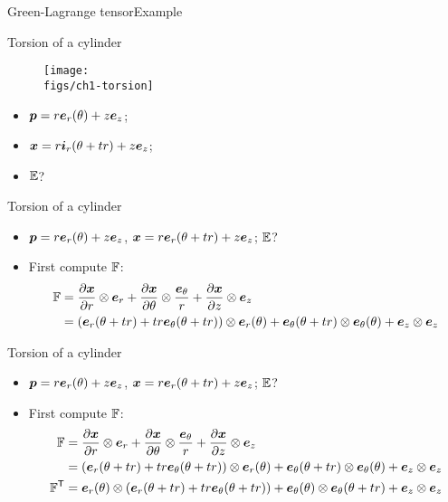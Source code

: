 \begin{frame}{Green-Lagrange tensor}{Example}

\begin{overprint}

\vskip-20pt
\begin{block}{Torsion of a cylinder}
\begin{figure}
\centering\texttt{[image: \\figs/ch1-torsion]}
\end{figure}
\begin{itemize}
\item ${\boldsymbol{p}}=r{\boldsymbol{e}}_r(\theta)+z{\boldsymbol{e}}_z$;
\item ${\boldsymbol{x}}=r{\boldsymbol{i}}_r(\theta+tr)+z{\boldsymbol{e}}_z$;
\item ${\mathbb{E}}$?
\end{itemize}
\end{block}

\vskip-20pt
\begin{block}{Torsion of a cylinder}
\begin{itemize}
\item ${\boldsymbol{p}}=r{\boldsymbol{e}}_r(\theta)+z{\boldsymbol{e}}_z$, ${\boldsymbol{x}}=r{\boldsymbol{e}}_r(\theta+tr)+z{\boldsymbol{e}}_z$; ${\mathbb{E}}$?
\item First compute ${\mathbb F}$:
{\scriptsize
\begin{displaymath}
\begin{split}
{\mathbb F} &=\frac{\partial{\boldsymbol{x}}}{\partial r}\otimes{\boldsymbol{e}}_r+\frac{\partial{\boldsymbol{x}}}{\partial\theta}\otimes\frac{{\boldsymbol{e}}_\theta}{r}+\frac{\partial{\boldsymbol{x}}}{\partial z}\otimes{\boldsymbol{e}}_z \\
&=({\boldsymbol{e}}_r(\theta+tr)+tr{\boldsymbol{e}}_\theta(\theta+tr))\otimes{\boldsymbol{e}}_r(\theta)+{\boldsymbol{e}}_\theta(\theta+tr)\otimes{\boldsymbol{e}}_\theta(\theta)+{\boldsymbol{e}}_z\otimes{\boldsymbol{e}}_z
\end{split}
\end{displaymath}}
\end{itemize}
\end{block}

\vskip-20pt
\begin{block}{Torsion of a cylinder}
\begin{itemize}
\item ${\boldsymbol{p}}=r{\boldsymbol{e}}_r(\theta)+z{\boldsymbol{e}}_z$, ${\boldsymbol{x}}=r{\boldsymbol{e}}_r(\theta+tr)+z{\boldsymbol{e}}_z$; ${\mathbb{E}}$?
\item First compute ${\mathbb F}$:
{\scriptsize
\begin{displaymath}
\begin{split}
{\mathbb F} &=\frac{\partial{\boldsymbol{x}}}{\partial r}\otimes{\boldsymbol{e}}_r+\frac{\partial{\boldsymbol{x}}}{\partial\theta}\otimes\frac{{\boldsymbol{e}}_\theta}{r}+\frac{\partial{\boldsymbol{x}}}{\partial z}\otimes{\boldsymbol{e}}_z \\
&=({\boldsymbol{e}}_r(\theta+tr)+tr{\boldsymbol{e}}_\theta(\theta+tr))\otimes{\boldsymbol{e}}_r(\theta)+{\boldsymbol{e}}_\theta(\theta+tr)\otimes{\boldsymbol{e}}_\theta(\theta)+{\boldsymbol{e}}_z\otimes{\boldsymbol{e}}_z \\
{\mathbb F}^{\sf T} &={\boldsymbol{e}}_r(\theta)\otimes({\boldsymbol{e}}_r(\theta+tr)+tr{\boldsymbol{e}}_\theta(\theta+tr))+{\boldsymbol{e}}_\theta(\theta)\otimes{\boldsymbol{e}}_\theta(\theta+tr)+{\boldsymbol{e}}_z\otimes{\boldsymbol{e}}_z
\end{split}
\end{displaymath}}
\end{itemize}
\end{block}


\end{overprint}
\end{frame}
